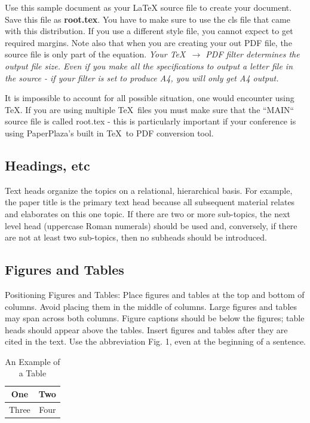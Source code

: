 \documentclass[letterpaper, 10 pt, conference]{ieeeconf}  %
\begin{document}
Use this sample document as your LaTeX source file to create your document. Save this file as {\bf root.tex}. You have to make sure to use the cls file that came with this distribution. If you use a different style file, you cannot expect to get required margins. Note also that when you are creating your out PDF file, the source file is only part of the equation. {\it Your \TeX\ $\rightarrow$ PDF filter determines the output file size. Even if you make all the specifications to output a letter file in the source - if your filter is set to produce A4, you will only get A4 output. }

It is impossible to account for all possible situation, one would encounter using \TeX. If you are using multiple \TeX\ files you must make sure that the ``MAIN`` source file is called root.tex - this is particularly important if your conference is using PaperPlaza's built in \TeX\ to PDF conversion tool.

\subsection{Headings, etc}

Text heads organize the topics on a relational, hierarchical basis. For example, the paper title is the primary text head because all subsequent material relates and elaborates on this one topic. If there are two or more sub-topics, the next level head (uppercase Roman numerals) should be used and, conversely, if there are not at least two sub-topics, then no subheads should be introduced. 

\subsection{Figures and Tables}

Positioning Figures and Tables: Place figures and tables at the top and bottom of columns. Avoid placing them in the middle of columns. Large figures and tables may span across both columns. Figure captions should be below the figures; table heads should appear above the tables. Insert figures and tables after they are cited in the text. Use the abbreviation Fig. 1, even at the beginning of a sentence.

\begin{table}[h]
\caption{An Example of a Table}
\label{table_example}
\begin{center}
\begin{tabular}{|c||c|}
\hline
One & Two\\
\hline
Three & Four\\
\hline
\end{tabular}
\end{center}
\end{table}
\end{document}
